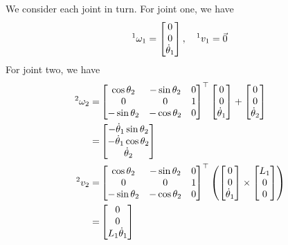 \documentclass{article}
\begin{document}
We consider each joint in turn.
For joint one, we have
\[
    \prescript{1}{}{\omega_1} = \begin{bmatrix}
        0 \\ 0 \\ \dot \theta_1
    \end{bmatrix}, \quad
    \prescript{1}{}{v_1} = \vec 0
\]
For joint two, we have
\[
    \begin{aligned}
    \prescript{2}{}{\omega_2} = &
    \begin{bmatrix}
        \cos \theta_2 & - \sin \theta_2 & 0  \\
        0 & 0 & 1 \\
        -\sin \theta_2 & - \cos \theta_2 & 0
    \end{bmatrix}^\top
    \begin{bmatrix}
        0 \\ 0 \\ \dot \theta_1
    \end{bmatrix} +
    \begin{bmatrix}
        0 \\ 0 \\ \dot \theta_2
    \end{bmatrix} \\
    = & \begin{bmatrix}
        -\dot \theta_1 \sin\theta_2 \\
        -\dot \theta_1 \cos\theta_2 \\
        \dot \theta_2
    \end{bmatrix} \\
    \prescript{2}{}{v_2} = &
    \begin{bmatrix}
        \cos \theta_2 & - \sin \theta_2 & 0  \\
        0 & 0 & 1 \\
        -\sin \theta_2 & - \cos \theta_2 & 0
    \end{bmatrix}^\top
    \left(
        \begin{bmatrix}
            0 \\ 0 \\ \dot \theta_1
        \end{bmatrix}
        \times
        \begin{bmatrix}
           L_1 \\ 0 \\ 0
        \end{bmatrix}
    \right) \\ = & \begin{bmatrix}
        0 \\ 0 \\ L_1 \dot\theta_1
    \end{bmatrix}
    \end{aligned}
\]
\end{document}
